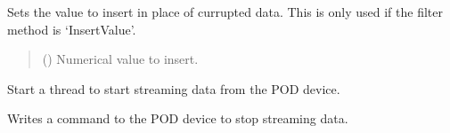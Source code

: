 \documentclass[letterpaper,10pt,english]{sphinxmanual}
\begin{document}
\begin{fulllineitems}
\begin{fulllineitems}
\label{\detokenize{PodApi.Stream.Collect:PodApi.Stream.Collect.DataHose.Hose.SetFilterInsertValue}}
\pysigstartsignatures
{}
\pysigstopsignatures
\sphinxAtStartPar
Sets the value to insert in place of currupted data. This is only used if the filter method is ‘InsertValue’.
\begin{quote}\begin{description}
\sphinxAtStartPar
{} () \textendash{} Numerical value to insert.

\end{description}\end{quote}

\end{fulllineitems}


\begin{fulllineitems}
\label{\detokenize{PodApi.Stream.Collect:PodApi.Stream.Collect.DataHose.Hose.StartStream}}
\pysigstartsignatures
{}
\pysigstopsignatures
\sphinxAtStartPar
Start a thread to start streaming data from the POD device.

\end{fulllineitems}


\begin{fulllineitems}
\label{\detokenize{PodApi.Stream.Collect:PodApi.Stream.Collect.DataHose.Hose.StopStream}}
\pysigstartsignatures
{}
\pysigstopsignatures
\sphinxAtStartPar
Writes a command to the POD device to stop streaming data.

\end{fulllineitems}



\end{fulllineitems}
\end{document}
